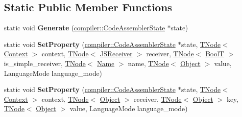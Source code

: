 \subsection*{Static Public Member Functions}
\begin{DoxyCompactItemize}
\item 
\mbox{\label{classv8_1_1internal_1_1KeyedStoreGenericGenerator_aedefafde0fa140ec9ce6aadbd8a54aaf}} 
static void {\bfseries Generate} (\mbox{\hyperlink{classv8_1_1internal_1_1compiler_1_1CodeAssemblerState}{compiler\+::\+Code\+Assembler\+State}} $\ast$state)
\item 
\mbox{\label{classv8_1_1internal_1_1KeyedStoreGenericGenerator_a17da2dd29f255097468a2316f5be01bc}} 
static void {\bfseries Set\+Property} (\mbox{\hyperlink{classv8_1_1internal_1_1compiler_1_1CodeAssemblerState}{compiler\+::\+Code\+Assembler\+State}} $\ast$state, \mbox{\hyperlink{classv8_1_1internal_1_1compiler_1_1TNode}{T\+Node}}$<$ \mbox{\hyperlink{classv8_1_1internal_1_1Context}{Context}} $>$ context, \mbox{\hyperlink{classv8_1_1internal_1_1compiler_1_1TNode}{T\+Node}}$<$ \mbox{\hyperlink{classv8_1_1internal_1_1JSReceiver}{J\+S\+Receiver}} $>$ receiver, \mbox{\hyperlink{classv8_1_1internal_1_1compiler_1_1TNode}{T\+Node}}$<$ \mbox{\hyperlink{structv8_1_1internal_1_1BoolT}{BoolT}} $>$ is\+\_\+simple\+\_\+receiver, \mbox{\hyperlink{classv8_1_1internal_1_1compiler_1_1TNode}{T\+Node}}$<$ \mbox{\hyperlink{classv8_1_1internal_1_1Name}{Name}} $>$ name, \mbox{\hyperlink{classv8_1_1internal_1_1compiler_1_1TNode}{T\+Node}}$<$ \mbox{\hyperlink{classv8_1_1internal_1_1Object}{Object}} $>$ value, Language\+Mode language\+\_\+mode)
\item 
\mbox{\label{classv8_1_1internal_1_1KeyedStoreGenericGenerator_abdd8e4d6d2c6a65d1ca4ef0dbb30fc7c}} 
static void {\bfseries Set\+Property} (\mbox{\hyperlink{classv8_1_1internal_1_1compiler_1_1CodeAssemblerState}{compiler\+::\+Code\+Assembler\+State}} $\ast$state, \mbox{\hyperlink{classv8_1_1internal_1_1compiler_1_1TNode}{T\+Node}}$<$ \mbox{\hyperlink{classv8_1_1internal_1_1Context}{Context}} $>$ context, \mbox{\hyperlink{classv8_1_1internal_1_1compiler_1_1TNode}{T\+Node}}$<$ \mbox{\hyperlink{classv8_1_1internal_1_1Object}{Object}} $>$ receiver, \mbox{\hyperlink{classv8_1_1internal_1_1compiler_1_1TNode}{T\+Node}}$<$ \mbox{\hyperlink{classv8_1_1internal_1_1Object}{Object}} $>$ key, \mbox{\hyperlink{classv8_1_1internal_1_1compiler_1_1TNode}{T\+Node}}$<$ \mbox{\hyperlink{classv8_1_1internal_1_1Object}{Object}} $>$ value, Language\+Mode language\+\_\+mode)

\end{DoxyCompactItemize}
